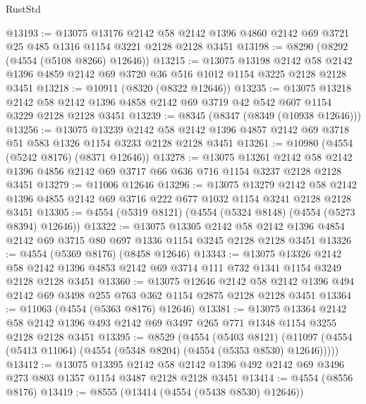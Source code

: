 \begin{lexlean}{RustStd}
\begin{coremodule}
@13193 := @13075
    @13176
    @2142
    @58
    @2142
    @1396
    @4860
    @2142
    @69
    @3721
    @25
    @485
    @1316
    @1154
    @3221
    @2128
    @2128
    @3451
@13198 := @8290 (@8292 (@4554 (@5108 @8266) @12646))
@13215 := @13075
    @13198
    @2142
    @58
    @2142
    @1396
    @4859
    @2142
    @69
    @3720
    @36
    @516
    @1012
    @1154
    @3225
    @2128
    @2128
    @3451
@13218 := @10911 (@8320 (@8322 @12646))
@13235 := @13075
    @13218
    @2142
    @58
    @2142
    @1396
    @4858
    @2142
    @69
    @3719
    @42
    @542
    @607
    @1154
    @3229
    @2128
    @2128
    @3451
@13239 := @8345 (@8347 (@8349 (@10938 @12646)))
@13256 := @13075
    @13239
    @2142
    @58
    @2142
    @1396
    @4857
    @2142
    @69
    @3718
    @51
    @583
    @1326
    @1154
    @3233
    @2128
    @2128
    @3451
@13261 := @10980 (@4554 (@5242 @8176) (@8371 @12646))
@13278 := @13075
    @13261
    @2142
    @58
    @2142
    @1396
    @4856
    @2142
    @69
    @3717
    @66
    @636
    @716
    @1154
    @3237
    @2128
    @2128
    @3451
@13279 := @11006 @12646
@13296 := @13075
    @13279
    @2142
    @58
    @2142
    @1396
    @4855
    @2142
    @69
    @3716
    @222
    @677
    @1032
    @1154
    @3241
    @2128
    @2128
    @3451
@13305 := @4554 (@5319 @8121) (@4554 (@5324 @8148) (@4554 (@5273 @8394) @12646))
@13322 := @13075
    @13305
    @2142
    @58
    @2142
    @1396
    @4854
    @2142
    @69
    @3715
    @80
    @697
    @1336
    @1154
    @3245
    @2128
    @2128
    @3451
@13326 := @4554 (@5369 @8176) (@8458 @12646)
@13343 := @13075
    @13326
    @2142
    @58
    @2142
    @1396
    @4853
    @2142
    @69
    @3714
    @111
    @732
    @1341
    @1154
    @3249
    @2128
    @2128
    @3451
@13360 := @13075
    @12646
    @2142
    @58
    @2142
    @1396
    @494
    @2142
    @69
    @3498
    @255
    @763
    @362
    @1154
    @2875
    @2128
    @2128
    @3451
@13364 := @11063 (@4554 (@5363 @8176) @12646)
@13381 := @13075
    @13364
    @2142
    @58
    @2142
    @1396
    @493
    @2142
    @69
    @3497
    @265
    @771
    @1348
    @1154
    @3255
    @2128
    @2128
    @3451
@13395 := @8529
    (@4554
      (@5403 @8121)
      (@11097 (@4554 (@5413 @11064) (@4554 (@5348 @8204) (@4554 (@5353 @8530) @12646)))))
@13412 := @13075
    @13395
    @2142
    @58
    @2142
    @1396
    @492
    @2142
    @69
    @3496
    @273
    @803
    @1357
    @1154
    @3487
    @2128
    @2128
    @3451
@13414 := @4554 (@8556 @8176)
@13419 := @8555 (@13414 (@4554 (@5438 @8530) @12646))

\end{coremodule}
\end{lexlean}
